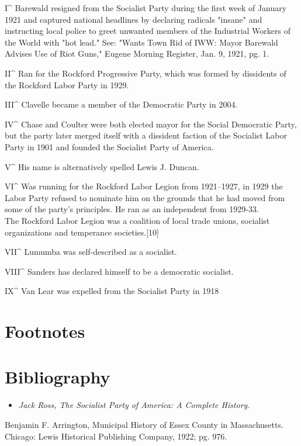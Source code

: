 I\^{} Barewald resigned from the Socialist Party during the first week
of January 1921 and captured national headlines by declaring radicals
"insane" and instructing local police to greet unwanted members of the
Industrial Workers of the World with "hot lead." See: "Wants Town Rid of
IWW: Mayor Barewald Advises Use of Riot Guns," Eugene Morning Register,
Jan. 9, 1921, pg. 1.

II\^{} Ran for the Rockford Progressive Party, which was formed by
dissidents of the Rockford Labor Party in 1929.

III\^{} Clavelle became a member of the Democratic Party in 2004.

IV\^{} Chase and Coulter were both elected mayor for the Social
Democratic Party, but the party later merged itself with a dissident
faction of the Socialist Labor Party in 1901 and founded the Socialist
Party of America.

V\^{} His name is alternatively spelled Lewis J. Duncan.

VI\^{} Was running for the Rockford Labor Legion from 1921--1927, in
1929 the Labor Party refused to nominate him on the grounds that he had
moved from some of the party's principles. He ran as an independent from
1929-33.\\
The Rockford Labor Legion was a coalition of local trade unions,
socialist organizations and temperance societies.{[}10{]}

VII\^{} Lumumba was self-described as a socialist.

VIII\^{} Sanders has declared himself to be a democratic socialist.

IX\^{} Van Lear was expelled from the Socialist Party in 1918

\section{Footnotes}\label{footnotes}

\section{Bibliography}\label{bibliography}

\begin{itemize}
\item
  \emph{Jack Ross, The Socialist Party of America: A Complete History.}
\end{itemize}

Benjamin F. Arrington, Municipal History of Essex County in
Massachusetts. Chicago: Lewis Historical Publishing Company, 1922; pg.
976.

